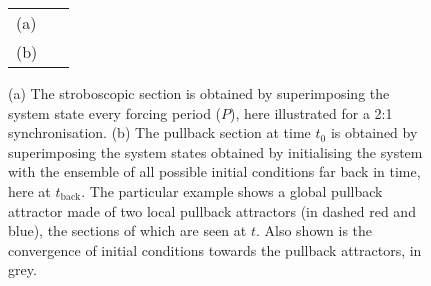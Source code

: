 %
\begin{figure}
\begin{tabular}{ll}
(a) & \
 \\
(b) & 
 \\
\end{tabular}
\caption{(a) The stroboscopic section is obtained by superimposing the system state every forcing period ($P$), here illustrated for a 2:1 synchronisation. (b) The pullback section at time $t_0$ is obtained by superimposing the system states obtained by initialising the system with the ensemble of all possible initial conditions far back in time, here at $t_{\mathrm{back}}$. The particular example shows a global pullback attractor made of two local pullback attractors (in dashed red and blue), the sections of which are seen at $t$. Also shown is the convergence of initial conditions towards the pullback attractors, in grey. }
\label{fig:pullback}
\end{figure}
%

